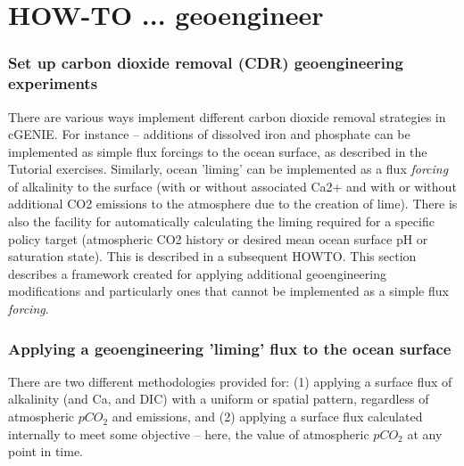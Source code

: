 \section{HOW-TO ... geoengineer}

\subsubsection{Set up carbon dioxide removal (CDR) geoengineering experiments}
\vspace{1mm}

There are various ways implement different carbon dioxide removal strategies in cGENIE. For instance -- additions of dissolved iron and phosphate can be implemented as simple flux forcings to the ocean surface, as described in the Tutorial exercises. Similarly, ocean 'liming'
 can be implemented as a flux \textit{forcing} of alkalinity to the surface (with or without associated Ca2+ and with or without additional CO2 emissions to the atmosphere due to the creation of lime).
There is also the facility for automatically calculating the liming required for a specific policy target (atmospheric CO2 history or desired mean ocean surface pH or saturation state). This is described in a subsequent HOWTO.
This section describes a framework created for applying additional geoengineering modifications and particularly ones that cannot be implemented as a simple flux \textit{forcing}.

%
\newpage
\subsubsection{Applying a geoengineering 'liming' flux to the ocean surface}
\vspace{1mm}

There are two different methodologies provided for: (1) applying a surface flux of alkalinity (and Ca, and DIC) with a uniform or spatial pattern, regardless of atmospheric \(pCO_{2}\) and emissions, and (2) applying a surface flux calculated internally to meet some objective -- here, the value of atmospheric \(pCO_{2}\) at any point in time.

